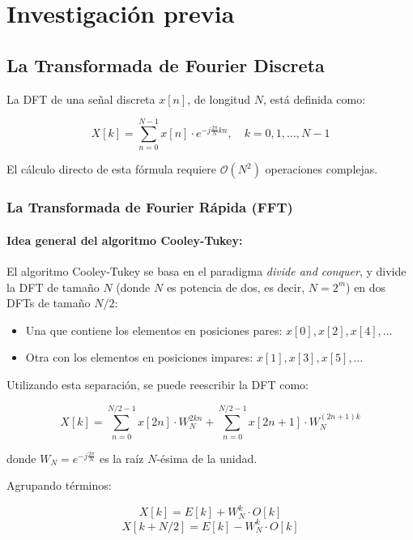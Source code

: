 \section{Investigación previa}

\subsection{La Transformada de Fourier Discreta}

La DFT de una señal discreta $x[n]$, de longitud $N$, está definida como:

\begin{equation}
    X[k] = \sum_{n=0}^{N-1} x[n] \cdot e^{-j \frac{2\pi}{N}kn}, \quad k = 0, 1, ..., N-1
\end{equation}

El cálculo directo de esta fórmula requiere $\mathcal{O}(N^2)$ operaciones complejas.

\subsubsection{La Transformada de Fourier Rápida (FFT)}
\paragraph{Idea general del algoritmo Cooley-Tukey:}

El algoritmo Cooley-Tukey se basa en el paradigma \textit{divide and conquer}, y divide la DFT de tamaño $N$ (donde $N$ es potencia de dos, es decir, $N=2^m$) en dos DFTs de tamaño $N/2$:

\begin{itemize}
    \item Una que contiene los elementos en posiciones pares: $x[0], x[2], x[4], \dots$
    \item Otra con los elementos en posiciones impares: $x[1], x[3], x[5], \dots$
\end{itemize}

Utilizando esta separación, se puede reescribir la DFT como:

\begin{equation}
    X[k] = \sum_{n=0}^{N/2 - 1} x[2n] \cdot W_N^{2kn} + \sum_{n=0}^{N/2 - 1} x[2n+1] \cdot W_N^{(2n+1)k}
\end{equation}

donde $W_N = e^{-j\frac{2\pi}{N}}$ es la raíz $N$-ésima de la unidad.

Agrupando términos:

\begin{equation}
    X[k] = E[k] + W_N^k \cdot O[k]
\end{equation}
\begin{equation}
    X[k + N/2] = E[k] - W_N^k \cdot O[k]
\end{equation}

